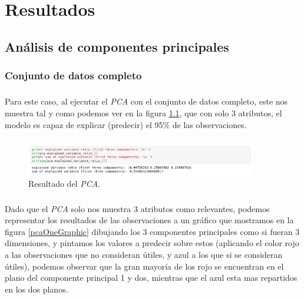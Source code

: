 \chapter{Resultados}
\label{chapter:resultados}

\section{Análisis de componentes principales}
\label{resultados:pca}
\subsection{Conjunto de datos completo}

\paragraph{}
Para este caso, al ejecutar el \textit{PCA} con el conjunto de datos completo, este nos muestra tal y como podemos ver en la figura \ref{pcaOneResult}, que con solo 3 atributos, el modelo es capaz de explicar (predecir) el 95\% de las observaciones.

\paragraph{}
\begin{figure}[!htb]
  \centering
    \includegraphics[width=0.9\textwidth]{images/resultados_procesado_de_datos_pca1_result.png}
    \caption{Resultado del \textit{PCA}.}
  \label{pcaOneResult}
\end{figure}

\paragraph{}
Dado que el \textit{PCA} solo nos muestra 3 atributos como relevantes, podemos representar los resultados de las observaciones a un gráfico que mostramos en la figura \ref{pcaOneGraphic} dibujando los 3 componentes principales como si fueran 3 dimensiones, y pintamos los valores a predecir sobre estos (aplicando el color rojo a las observaciones que no consideran útiles, y azul a los que si se consideran útiles), podemos observar que la gran mayoría de los rojo se encuentran en el plano del componente principal 1 y dos, mientras que el azul esta mas repartidos en los dos planos.

